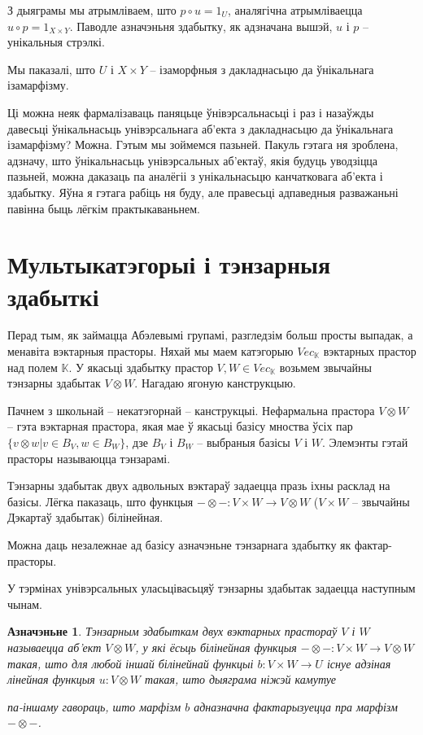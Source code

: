 \documentclass[a4paper,12pt]{book}
\newtheorem{definition}{Азначэньне}[section]
\begin{document}
З дыяграмы мы атрымліваем, што $p \circ u = 1_U$, аналягічна
атрымліваецца $u \circ p = 1_{X \times Y}$. Паводле азначэньня
здабытку, як адзначана вышэй, $u$ і $p$ -- унікальныя стрэлкі.

Мы паказалі, што $U$ і $X \times Y$ -- ізаморфныя з дакладнасьцю да
ўнікальнага ізамарфізму.

Ці можна неяк фармалізаваць паняцьце ўнівэрсальнасьці і раз і назаўжды
давесьці ўнікальнасьць унівэрсальнага аб'екта з дакладнасьцю да
ўнікальнага ізамарфізму? Можна. Гэтым мы зоймемся пазьней. Пакуль
гэтага
ня зроблена, адзначу, што ўнікальнасьць унівэрсальных аб'ектаў, якія
будуць уводзіцца пазьней, можна даказаць па аналёгіі з унікальнасьцю
канчатковага аб'екта і здабытку. Яўна я гэтага рабіць ня буду, але
правесьці адпаведныя разважаньні павінна быць лёгкім практыкаваньнем.

\section{Мультыкатэгорыі і тэнзарныя здабыткі}

Перад тым, як займацца Абэлевымі групамі, разгледзім больш просты
выпадак, а менавіта вэктарныя прасторы. Няхай мы маем катэгорыю
$Vec_{\mathbb{K}}$ вэктарных прастор
над полем $\mathbb{K}$. У якасьці здабытку прастор $V, W \in
Vec_{\mathbb{K}}$ возьмем звычайны тэнзарны здабытак $V \otimes
W$. Нагадаю ягоную канструкцыю.

Пачнем з школьнай -- некатэгорнай -- канструкцыі. Нефармальна прастора
$V \otimes W$ -- гэта вэктарная прастора, якая мае ў якасьці базісу
мноства ўсіх пар $\{v \otimes w|v \in B_V, w \in B_W\}$, дзе $B_V$ і
$B_W$ -- выбраныя базісы $V$ і $W$. Элемэнты гэтай
прасторы называюцца тэнзарамі.

Тэнзарны здабытак двух адвольных вэктараў задаецца празь іхны расклад
на базісы. Лёгка паказаць, што функцыя $- \otimes -: V \times W
\rightarrow V \otimes W$ ($V \times W$ -- звычайны Дэкартаў здабытак)
білінейная.

Можна даць незалежнае ад базісу азначэньне тэнзарнага здабытку як
фактар-прасторы.

У тэрмінах унівэрсальных уласьцівасьцяў тэнзарны здабытак задаецца
наступным чынам.

\begin{definition}
  Тэнзарным здабыткам двух вэктарных прастораў $V$ і $W$ называецца
  аб'ект $V \otimes W$, у які ёсьць білінейная функцыя $- \otimes -: V \times W
  \rightarrow V \otimes W$ такая, што для любой іншай білінейнай
  функцыі $b: V \times W \rightarrow U$ існуе адзіная лінейная
  функцыя $u: V \otimes W$ такая, што дыяграма ніжэй камутуе


  па-іншаму гавораць, што марфізм $b$ адназначна фактарызуецца пра
  марфізм $- \otimes -$.
\end{definition}
\end{document}
